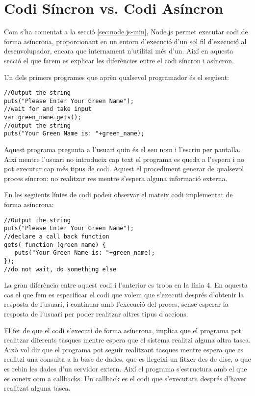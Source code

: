\section{Codi Síncron vs. Codi Asíncron}
\label{sec:sincron-ascinron}

Com s'ha comentat a la secció \ref{sec:node.js-min}, Node.js permet executar codi de forma asíncrona, proporcionant en un entorn d'execució d'un sol fil d'execució al desenvolupador, encara que internament n'utilitzi més d'un. Així en aquesta secció el que farem es explicar les diferències entre el codi síncron i asíncron.

Un dels primers programes que aprèn qualsevol programador és el següent:

\begin{lstlisting}
//Output the string
puts("Please Enter Your Green Name");
//wait for and take input
var green_name=gets();
//output the string
puts("Your Green Name is: "+green_name);
\end{lstlisting}

Aquest programa pregunta a l'usuari quin és el seu nom i l'escriu per pantalla. Així mentre l'usuari no introdueix cap text el programa es queda a l'espera i no pot executar cap més tipus de codi. Aquest el procediment generar de qualsevol proces síncron: no realitzar res mentre s'espera alguna informació externa.

En les següents línies de codi podeu observar el mateix codi implementat de forma asíncrona:
	
\begin{lstlisting}
//Output the string
puts("Please Enter Your Green Name");
//declare a call back function
gets( function (green_name) {
   puts("Your Green Name is: "+green_name);
});
//do not wait, do something else
\end{lstlisting}

La gran diferència entre aquest codi i l'anterior es troba en la línia 4. En aquesta cas el que fem es especificar el codi que volem que s'executi després d'obtenir la resposta de l'usuari, i continuar amb l'execució del proces, sense esperar la resposta de l'usuari per poder realitzar altres tipus d'accions. 

El fet de que el codi s'executi de forma asíncrona, implica que el programa pot realitzar diferents tasques mentre espera que el sistema realitzi alguna altra tasca. Això vol dir que el programa pot seguir realitzant tasques mentre espera que es realitzi una consulta a la base de dades, que es llegeixi un fitxer des de disc, o que es rebin les dades d'un servidor extern. Així el programa s'estructura amb el que es coneix com a callbacks. Un callback es el codi que s'executara després d'haver realitzat alguna tasca. 

